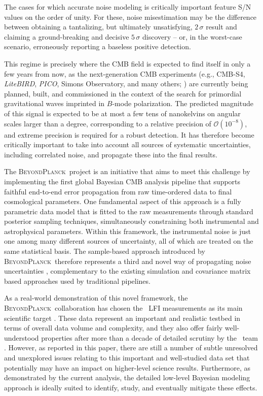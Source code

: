 \documentclass{aa}
\newcommand{\BP}{\textsc{BeyondPlanck}}
\begin{document}
The cases for which accurate noise modeling is critically important
feature S/N values on the order of unity. For these, noise
misestimation may be the difference between obtaining a tantalizing,
but ultimately unsatisfying, $2\,\sigma$ result and claiming a
ground-breaking and decisive $5\,\sigma$ discovery -- or, in the
worst-case scenario, erroneously reporting a baseless positive
detection.

This regime is precisely where the CMB field is expected to find
itself in only a few years from now, as the next-generation CMB
experiments (e.g., CMB-S4, \textit{LiteBIRD}, \textit{PICO}, Simons Observatory, and
many others; \citealp{cmbS4,litebird2018,litebird2020,litebird2022,pico2019,SO2019}) are
currently being planned, built, and commissioned in the context of the search for
primordial gravitational waves imprinted in $B$-mode polarization. The
predicted magnitude of this signal is expected to be at most a few
tens of nanokelvins on angular scales larger than a degree,
corresponding to a relative precision of $\mathcal{O}(10^{-8})$, and
extreme precision is required for a robust detection. It has
therefore become critically important to take into account all sources
of systematic uncertainties, including correlated noise, and propagate 
these into the final results.

The \BP\ project \citep{bp01} is an initiative that aims to meet
this challenge by implementing the first global Bayesian CMB analysis
pipeline that supports faithful end-to-end error propagation from raw
time-ordered data to final cosmological parameters. One fundamental
aspect of this approach is a fully parametric data model that is
fitted to the raw measurements through standard posterior sampling
techniques, simultaneously constraining both instrumental and
astrophysical parameters. Within this framework, the instrumental
noise is just one among many different sources of uncertainty, all of
which are treated on the same statistical basis. The sample-based
approach introduced by \BP\ therefore represents a third and novel way
of propagating noise uncertainties \citep{bp02,bp10}, complementary to the existing
simulation and covariance matrix based approaches used by traditional
pipelines.

As a real-world demonstration of this novel framework, the
\BP\ collaboration has chosen the \Planck\ LFI measurements
\citep{planck2016-l01,planck2016-l02} as its main scientific target
\citep{bp01}. These data represent an important and realistic testbed
in terms of overall data volume and complexity, and they also offer
fairly well-understood properties after more than a decade of detailed
scrutiny by the \Planck\ team \citep[see][and references
  therein]{planck2013-p02,planck2014-a03,planck2016-l02}. However, as
reported in this paper, there are still a number of subtle unresolved
and unexplored issues relating to this important and
well-studied data set that potentially may have an impact on
higher-level science results. Furthermore, as demonstrated by the
current analysis, the detailed low-level Bayesian modeling approach
is ideally suited to identify, study, and eventually mitigate these
effects.
\end{document}
